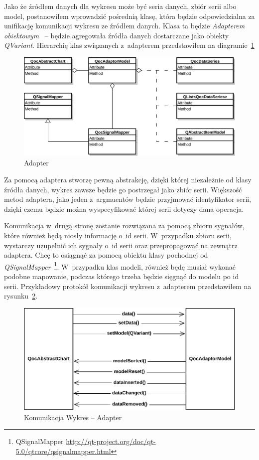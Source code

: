 Jako że źródłem danych dla wykresu może być seria danych, zbiór serii albo model, postanowiłem wprowadzić pośrednią klasę, która będzie odpowiedzialna za unifikację komunikacji wykresu ze źródłem danych. Klasa ta będzie \textit{Adapterem obiektowym}~\cite{Patterns} -- będzie agregowała źródła danych dostarczane jako obiekty \textit{QVariant}. Hierarchię klas związanych z~adapterem przedstawiłem na diagramie~\ref{rys:adapter:model}

\begin{figure}[H]
\centering
\includegraphics[scale=0.8]{img/adapter-model.pdf}
\caption{Adapter}\label{rys:adapter:model}
\end{figure}

Za pomocą adaptera stworzę pewną abstrakcję, dzięki której niezależnie od klasy źródła danych, wykres zawsze będzie go postrzegał jako zbiór serii. Większość metod adaptera, jako jeden z~argmuentów będzie przyjmować identyfikator serii, dzięki czemu będzie można wyspecyfikować  której serii dotyczy dana operacja. 

Komunikacja w~drugą stronę zostanie rozwiązana za pomocą zbioru sygnałów, które również będą niosły informację o~id serii. W~przypadku zbioru serii, wystarczy uzupełnić ich sygnały o~id serii oraz przepropagować na zewnątrz adaptera. Chcę to osiągnąć za pomocą obiektu klasy pochodnej od \textit{QSignalMapper}~\footnote{QSignalMapper \url{http://qt-project.org/doc/qt-5.0/qtcore/qsignalmapper.html}}. W~przypadku klas modeli, również będę musiał wykonać podobne mapowanie, podczas którego trzeba będzie sięgnąć do modelu po id serii. Przykładowy protokół komunikacji wykresu z~adapterem przedstawiłem na rysunku~\ref{rys:wykres:model}.

\begin{figure}[H]
\centering
\includegraphics[scale=0.8]{img/wykres-model.pdf}
\caption{Komunikacja Wykres -- Adapter}\label{rys:wykres:model}
\end{figure}

